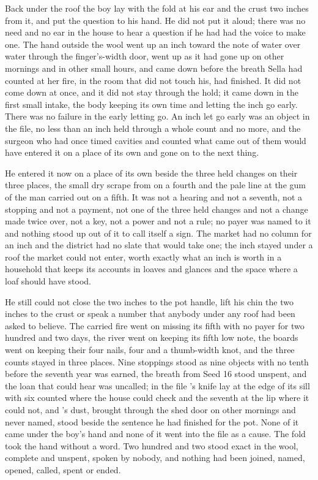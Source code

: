 \scenebreak

Back under the roof the boy lay with the fold at his ear and the crust two inches from it, and put the question to his hand. He did not put it aloud; there was no need and no ear in the house to hear a question if he had had the voice to make one. The hand outside the wool went up an inch toward the note of water over water through the finger's-width door, went up as it had gone up on other mornings and in other small hours, and came down before the breath Sella had counted at her fire, in the room that did not touch his, had finished. It did not come down at once, and it did not stay through the hold; it came down in the first small intake, the body keeping its own time and letting the inch go early. There was no failure in the early letting go. An inch let go early was an object in the file, no less than an inch held through a whole count and no more, and the surgeon who had once timed cavities and counted what came out of them would have entered it on a place of its own and gone on to the next thing.

He entered it now on a place of its own beside the three held changes on their three places, the small dry scrape from  on a fourth and the pale line at the gum of the man carried out on a fifth. It was not a hearing and not a seventh, not a stopping and not a payment, not one of the three held changes and not a change made twice over, not a key, not a power and not a rule; no payer was named to it and nothing stood up out of it to call itself a sign. The market had no column for an inch and the district had no slate that would take one; the inch stayed under a roof the market could not enter, worth exactly what an inch is worth in a household that keeps its accounts in loaves and glances and the space where a loaf should have stood.

He still could not close the two inches to the pot handle, lift his chin the two inches to the crust or speak a number that anybody under any roof had been asked to believe. The carried fire went on missing its fifth with no payer for two hundred and two days, the river went on keeping its fifth low note, the boards went on keeping their four nails, four and a thumb-width knot, and the three counts stayed in three places. Nine stoppings stood as nine objects with no tenth before the seventh year was earned, the breath from Seed 16 stood unspent, and the loan that could hear was uncalled; in the file 's knife lay at the edge of its sill with six counted where the house could check and the seventh at the lip where it could not, and 's dust, brought through the shed door on other mornings and never named, stood beside the sentence he had finished for the pot. None of it came under the boy's hand and none of it went into the file as a cause. The fold took the hand without a word. Two hundred and two stood exact in the wool, complete and unspent, spoken by nobody, and nothing had been joined, named, opened, called, spent or ended.
